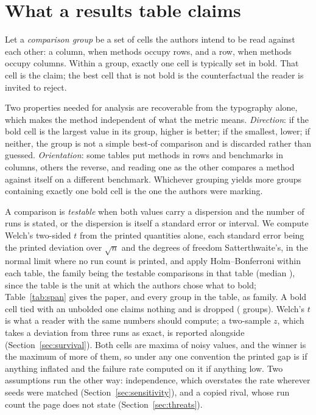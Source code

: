 \documentclass{article}
\begin{document}
\section{What a results table claims}
\label{sec:claim}

Let a \emph{comparison group} be a set of cells the authors intend to be read
against each other: a column, when methods occupy rows, and a row, when methods
occupy columns. Within a group, exactly one cell is typically set in bold. That
cell is the claim; the best cell that is not bold is the counterfactual the
reader is invited to reject.

Two properties needed for analysis are recoverable from the typography alone,
which makes the method independent of what the metric means.
\emph{Direction}: if the bold cell is the largest value in its group, higher is
better; if the smallest, lower; if neither, the group is not a simple best-of
comparison and is discarded rather than guessed. \emph{Orientation}: some
tables put methods in rows and benchmarks in columns, others the reverse, and
reading one as the other compares a method against itself on a different
benchmark. Whichever grouping yields more groups containing exactly one bold
cell is the one the authors were marking.

A comparison is \emph{testable} when both values carry a dispersion and the
number of runs is stated, or the dispersion is itself a standard error or
interval. We compute Welch's two-sided $t$ from the printed quantities alone,
each standard error being the printed deviation over $\sqrt{n}$ and the
degrees of freedom Satterthwaite's, in the normal limit where no run count is
printed, and apply Holm--Bonferroni within each table, the family being
the testable comparisons in that table (median \nFamilyMedian{}), since the
table is the unit at which the authors chose what to bold;
Table~\ref{tab:span} gives the paper, and every group in the table, as
family. A
bold cell tied with an unbolded one claims nothing and is dropped
(\nTiesDropped{} groups). Welch's $t$ is what a reader with the same numbers
should compute; a two-sample $z$, which takes a deviation from three runs as
exact, is reported alongside (Section~\ref{sec:survival}). Both cells are maxima of noisy values, and the
winner is the maximum of more of them, so under any one convention the
printed gap is if anything inflated and the failure rate computed on it if
anything low. Two assumptions run the other way: independence, which
overstates the rate wherever seeds were matched (Section~\ref{sec:sensitivity}),
and a copied rival, whose run count the page does not state
(Section~\ref{sec:threats}).
\end{document}
